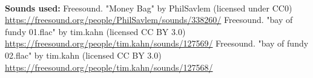 \documentclass{article}
\begin{document}
\begin{thebibliography}{9}
        \textbf{\\ Sounds used:}
        Freesound. "Money Bag" by PhilSavlem (licensed under CC0) \\
        \url{https://freesound.org/people/PhilSavlem/sounds/338260/}
        Freesound. "bay of fundy 01.flac" by tim.kahn (licensed CC BY 3.0) \\
        \url{https://freesound.org/people/tim.kahn/sounds/127569/}
        Freesound. "bay of fundy 02.flac" by tim.kahn (licensed CC BY 3.0) \\
        \url{https://freesound.org/people/tim.kahn/sounds/127568/}
    \end{thebibliography}
    
    \newpage
\end{document}
